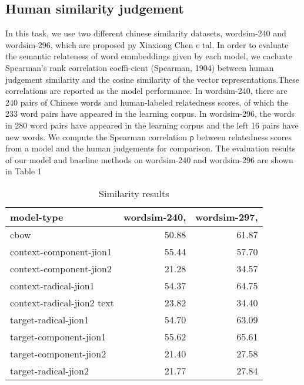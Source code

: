 \subsection{Human similarity judgement} 
In this task, we use two different chinese similarity datasets, wordsim-240 and wordsim-296, which are proposed py Xinxiong Chen e tal. In order to evaluate the semantic relateness of word emmbeddings given by each model, we cacluate Spearman’s rank correlation coeffi-cient (Spearman, 1904) between human judgement similarity and the cosine similarity of the vector representations.These correlations are reported as the model performance. 
In wordsim-240, there are 240 pairs of Chinese words and human-labeled relatedness scores, of which the 233 word pairs have appeared in the learning corpus. In wordsim-296, the words in 280 word pairs have appeared in the learning corpus and the left 16 pairs have new words.
We compute the Spearman correlation ρ between relatedness scores from a model and the human judgements for comparison. The evaluation results of our model and baseline methods on wordsim-240 and wordsim-296 are shown in Table 1
\begin{table}[h]
\begin{center}
\begin{tabular}{lrr}
\hline \bf model-type & \bf wordsim-240, & \bf wordsim-297, \\ \hline
cbow & 50.88 & 61.87 \\
context-component-jion1 & 55.44 & 57.70\\
context-component-jion2 & 21.28 & 34.57 \\
context-radical-jion1 & 54.37 & 64.75 \\
context-radical-jion2 text & 23.82  & 34.40\\
target-radical-jion1  & 54.70 & 63.09\\
target-component-jion1  & 55.62 & 65.61\\
target-component-jion2 & 21.40 & 27.58\\
target-radical-jion2 & 21.77 & 27.84\\
\hline
\end{tabular}
\end{center}
\caption{\label{font-table} Similarity results }
\end{table}

